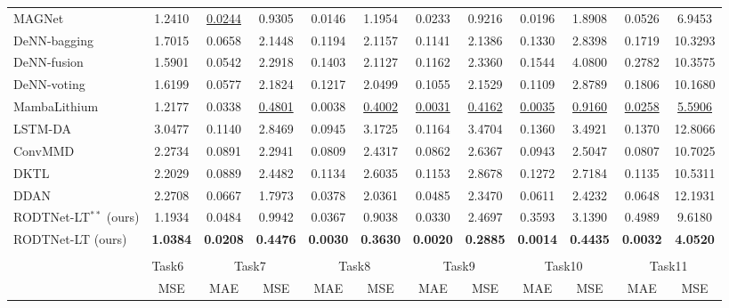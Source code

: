 \documentclass[lettersize,onecolumn]{IEEEtran}
\begin{document}
\begin{table}[htbp]
{\begin{threeparttable}
\begin{tabular}{lccccccccccc}
    MAGNet \cite{TAN2024103725} & 1.2410  & \underline{0.0244}  & 0.9305  & 0.0146  & 1.1954  & 0.0233  & 0.9216  & 0.0196  & 1.8908  & 0.0526  & 6.9453  \\
    DeNN-bagging \cite{10102497} & 1.7015  & 0.0658  & 2.1448  & 0.1194  & 2.1157  & 0.1141  & 2.1386  & 0.1330  & 2.8398  & 0.1719  & 10.3293  \\
    DeNN-fusion \cite{10102497} & 1.5901  & 0.0542  & 2.2918  & 0.1403  & 2.1127  & 0.1162  & 2.3360  & 0.1544  & 4.0800  & 0.2782  & 10.3575  \\
    DeNN-voting \cite{10102497} & 1.6199  & 0.0577  & 2.1824  & 0.1217  & 2.0499  & 0.1055  & 2.1529  & 0.1109  & 2.8789  & 0.1806  & 10.1680  \\
    MambaLithium \cite{shi2024mambalithiumselectivestatespace} & 1.2177  & 0.0338  & \underline{0.4801}  & 0.0038  & \underline{0.4002}  & \underline{0.0031}  & \underline{0.4162}  & \underline{0.0035}  & \underline{0.9160}  & \underline{0.0258}  & \underline{5.5906}  \\
    LSTM-DA \cite{HAN2022230823} & 3.0477  & 0.1140  & 2.8469  & 0.0945  & 3.1725  & 0.1164  & 3.4704  & 0.1360  & 3.4921  & 0.1370  & 12.8066  \\
    ConvMMD \cite{9788003} & 2.2734  & 0.0891  & 2.2941  & 0.0809  & 2.4317  & 0.0862  & 2.6367  & 0.0943  & 2.5047  & 0.0807  & 10.7025  \\
    DKTL \cite{10029904}  & 2.2029  & 0.0889  & 2.4482  & 0.1134  & 2.6035  & 0.1153  & 2.8678  & 0.1272  & 2.7184  & 0.1135  & 10.5311  \\
    DDAN \cite{9560040}  & 2.2708  & 0.0667  & 1.7973  & 0.0378  & 2.0361  & 0.0485  & 2.3470  & 0.0611  & 2.4232  & 0.0648  & 12.1931  \\
    RODTNet-LT$^{\ast\ast}$ {(ours)} & 1.1934  & 0.0484  & 0.9942  & 0.0367  & 0.9038  & 0.0330  & 2.4697  & 0.3593  & 3.1390  & 0.4989  & 9.6180  \\
    RODTNet-LT (ours) & \textbf{1.0384} & \textbf{0.0208} & \textbf{0.4476} & \textbf{0.0030} & \textbf{0.3630} & \textbf{0.0020} & \textbf{0.2885} & \textbf{0.0014} & \textbf{0.4435} & \textbf{0.0032} & \textbf{4.0520} \\
    \midrule
    \multicolumn{12}{c}{} \\
    \midrule
            & \multicolumn{1}{l}{Task6} & \multicolumn{2}{c}{Task7} & \multicolumn{2}{c}{Task8} & \multicolumn{2}{c}{Task9} & \multicolumn{2}{c}{Task10} & \multicolumn{2}{c}{Task11} \\
\cmidrule{2-12}          & MSE   & MAE   & MSE   & MAE   & MSE   & MAE   & MSE   & MAE   & MSE   & MAE   & MSE \\

\end{tabular}
\end{threeparttable}}
\end{table}
\end{document}
